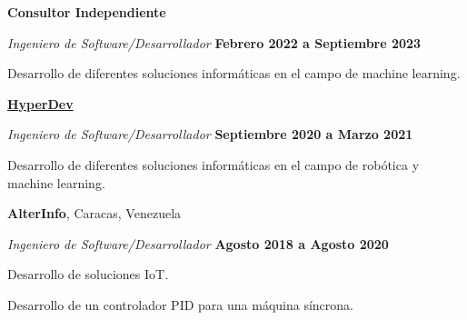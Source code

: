 \documentclass[10pt]{article}
\begin{document}
\textbf{Consultor Independiente}
\begin{outerlist}
    \item[] \textit{Ingeniero de Software/Desarrollador}
            \hfill \textbf{Febrero 2022 a Septiembre 2023}
            \begin{innerlist}
                \item Desarrollo de diferentes soluciones informáticas en el campo de machine learning.
            \end{innerlist}
\end{outerlist}

\href{https://hypedev.design/}{\textbf{HyperDev}}
\begin{outerlist}
    \item[] \textit{Ingeniero de Software/Desarrollador}
            \hfill \textbf{Septiembre 2020 a Marzo 2021}
            \begin{innerlist}
                \item Desarrollo de diferentes soluciones informáticas en el campo de robótica y machine learning.
            \end{innerlist}

\end{outerlist}

\textbf{AlterInfo}, Caracas, Venezuela
\begin{outerlist}
    \item[] \textit{Ingeniero de Software/Desarrollador}%
            \hfill \textbf{Agosto 2018 a Agosto 2020}
            \begin{innerlist}
                \item Desarrollo de soluciones IoT.
                \item Desarrollo de un controlador PID para una máquina síncrona.
            \end{innerlist}
\end{outerlist}
\end{document}
